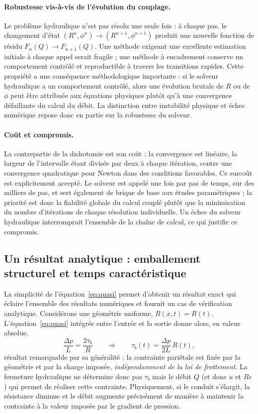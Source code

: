 \documentclass[11pt,a4paper]{report}
\begin{document}
\paragraph{Robustesse vis-à-vis de l'évolution du couplage.} Le problème hydraulique n'est pas résolu une
seule fois : à chaque pas, le changement d'état \((R^n,\phi^n)\to(R^{n+1},\phi^{n+1})\) produit une nouvelle
fonction de résidu \(F_n(Q) \to F_{n+1}(Q)\). Une méthode exigeant une excellente estimation initiale à
chaque appel serait fragile ; une méthode à encadrement conserve un comportement contrôlé et reproductible
à travers les transitions rapides. Cette propriété a une conséquence méthodologique importante : si le
solveur hydraulique a un comportement contrôlé, alors une évolution brutale de \(R\) ou de \(\phi\) peut
être attribuée aux équations physiques plutôt qu'à une convergence défaillante du calcul du débit. La
distinction entre instabilité physique et échec numérique repose donc en partie sur la robustesse du
solveur.

\paragraph{Coût et compromis.} La contrepartie de la dichotomie est son coût : la convergence est
linéaire, la largeur de l'intervalle étant divisée par deux à chaque itération, contre une convergence
quadratique pour Newton dans des conditions favorables. Ce surcoût est explicitement accepté. Le solveur
est appelé une fois par pas de temps, sur des milliers de pas, et sert également de brique de base aux
études paramétriques ; la priorité est donc la fiabilité globale du calcul couplé plutôt que la
minimisation du nombre d'itérations de chaque résolution individuelle. Un échec du solveur hydraulique
interromprait l'ensemble de la chaîne de calcul, ce qui justifie ce compromis.

\subsection{Un résultat analytique : emballement structurel et temps caractéristique}
\label{sec:instabilite}

La simplicité de l'équation~\eqref{eq:quasi} permet d'obtenir un résultat exact qui éclaire l'ensemble des
résultats numériques et fournit un cas de vérification analytique. Considérons une géométrie uniforme,
\(R(x,t) = R(t)\). L'équation~\eqref{eq:quasi} intégrée entre l'entrée et la sortie donne alors, en valeur
absolue,
\begin{equation}
\frac{\Delta p}{L} = \frac{2\tau_b}{R}
\qquad\Longrightarrow\qquad
\tau_b(t) = \frac{\Delta p}{2L}\,R(t),
\label{eq:tau-analytique}
\end{equation}
résultat remarquable par sa généralité : la contrainte pariétale est fixée par la géométrie et par la
charge imposée, \emph{indépendamment de la loi de frottement}. La fermeture hydraulique ne détermine donc
pas \(\tau_b\) mais le débit \(Q\) (et donc \(u\) et \(Re\)) qui permet de réaliser cette contrainte.
Physiquement, si le conduit s'élargit, la résistance diminue et le débit augmente précisément de manière à
maintenir la contrainte à la valeur imposée par le gradient de pression.
\end{document}
